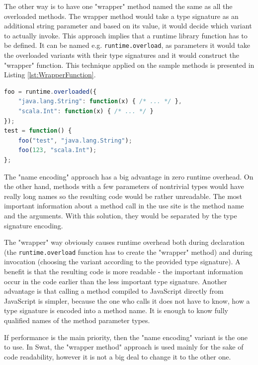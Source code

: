 \documentclass[12pt,a4paper]{report}
\begin{document}
The other way is to have one "wrapper" method named the same as all the overloaded methods. The wrapper method would take a type signature as an additional string parameter and based on its value, it would decide which variant to actually invoke. This approach implies that a runtime library function has to be defined. It can be named e.g. \texttt{runtime.overload}, as parameters it would take the overloaded variants with their type signatures and it would construct the "wrapper" function. This technique applied on the sample methods is presented in Listing \ref{lst:WrapperFunction}.

\begin{minipage}{\linewidth}
\begin{lstlisting}[language=JavaScript,caption={Overloading in JavaScript.},label={lst:WrapperFunction}]
foo = runtime.overloaded({
	"java.lang.String": function(x) { /* ... */ },
	"scala.Int": function(x) { /* ... */ }
});
test = function() {
	foo("test", "java.lang.String");
	foo(123, "scala.Int");
};
\end{lstlisting}
\end{minipage}

The "name encoding" approach has a big advantage in zero runtime overhead. On the other hand, methods with a few parameters of nontrivial types would have really long names so the resulting code would be rather unreadable. The most important information about a method call in the use site is the method name and the arguments. With this solution, they would be separated by the type signature encoding.

The "wrapper" way obviously causes runtime overhead both during declaration (the \texttt{runtime.overload} function has to create the "wrapper" method) and during invocation (choosing the variant according to the provided type signature). A benefit is that the resulting code is more readable - the important information occur in the code earlier than the less important type signature. Another advantage is that calling a method compiled to JavaScript directly from JavaScript is simpler, because the one who calls it does not have to know, how a type signature is encoded into a method name. It is enough to know fully qualified names of the method parameter types.

If performance is the main priority, then the "name encoding" variant is the one to use. In Swat, the "wrapper method" approach is used mainly for the sake of code readability, however it is not a big deal to change it to the other one.
\end{document}
